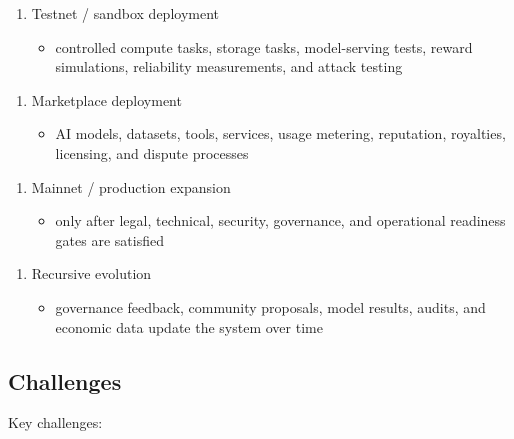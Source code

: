 ﻿\documentclass[12pt]{article}
\begin{document}
\begin{enumerate}
  \item Testnet / sandbox deployment
\begin{itemize}
  \item controlled compute tasks, storage tasks, model-serving tests, reward simulations, reliability measurements, and attack testing
\end{itemize}
\end{enumerate}

\begin{enumerate}
  \item Marketplace deployment
\begin{itemize}
  \item AI models, datasets, tools, services, usage metering, reputation, royalties, licensing, and dispute processes
\end{itemize}
\end{enumerate}

\begin{enumerate}
  \item Mainnet / production expansion
\begin{itemize}
  \item only after legal, technical, security, governance, and operational readiness gates are satisfied
\end{itemize}
\end{enumerate}

\begin{enumerate}
  \item Recursive evolution
\begin{itemize}
  \item governance feedback, community proposals, model results, audits, and economic data update the system over time
\end{itemize}
\end{enumerate}

\subsection{Challenges}


Key challenges:
\end{document}

